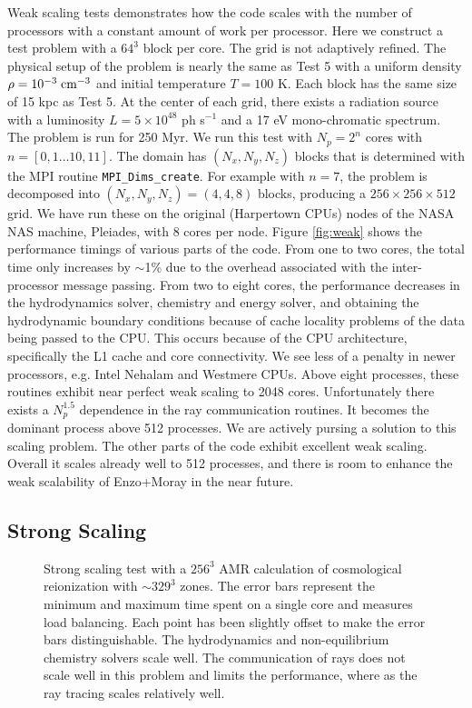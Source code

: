 \documentclass[useAMS,usenatbib,a4paper]{mn2e}
\begin{document}
Weak scaling tests demonstrates how the code scales with the number of
processors with a constant amount of work per processor.  Here we
construct a test problem with a $64^3$ block per core.  The grid is
not adaptively refined.  The physical setup of the problem is nearly
the same as Test 5 with a uniform density $\rho = 10^{-3} \;\cubecm$
and initial temperature $T = 100$ K.  Each block has the same size of
15 kpc as Test 5.  At the center of each grid, there exists a
radiation source with a luminosity $L = 5 \times 10^{48}$ ph s$^{-1}$
and a 17 eV mono-chromatic spectrum.  The problem is run for 250 Myr.
We run this test with $N_p = 2^n$ cores with $n = [0,1 \dots 10,11]$.
The domain has $(N_x, N_y, N_z)$ blocks that is determined with the
MPI routine \texttt{MPI\_Dims\_create}.  For example with $n = 7$, the
problem is decomposed into $(N_x, N_y, N_z) = (4,4,8)$ blocks,
producing a $256 \times 256 \times 512$ grid.  We have run these on
the original (Harpertown CPUs) nodes of the NASA NAS machine,
Pleiades, with 8 cores per node.  Figure \ref{fig:weak} shows the
performance timings of various parts of the code.  From one to two
cores, the total time only increases by $\sim$1\% due to the overhead
associated with the inter-processor message passing.  From two to
eight cores, the performance decreases in the hydrodynamics solver,
chemistry and energy solver, and obtaining the hydrodynamic boundary
conditions because of cache locality problems of the data being passed
to the CPU.  This occurs because of the CPU architecture, specifically
the L1 cache and core connectivity.  We see less of a penalty in newer
processors, e.g. Intel Nehalam and Westmere CPUs.  Above eight
processes, these routines exhibit near perfect weak scaling to 2048
cores.  Unfortunately there exists a $N_p^{1.5}$ dependence in the ray
communication routines.  It becomes the dominant process above 512
processes.  We are actively pursing a solution to this scaling
problem.  The other parts of the code exhibit excellent weak scaling.
Overall it scales already well to 512 processes, and there is room to
enhance the weak scalability of Enzo+Moray in the near future.

\subsection{Strong Scaling}
\label{sec:strong_sc}

\begin{figure}
  \caption{\label{fig:strong} Strong scaling test with a $256^3$ AMR
    calculation of cosmological reionization with $\sim329^3$ zones.
    The error bars represent the minimum and maximum time spent on a
    single core and measures load balancing.  Each point has been
    slightly offset to make the error bars distinguishable.  The
    hydrodynamics and non-equilibrium chemistry solvers scale well.
    The communication of rays does not scale well in this problem and
    limits the performance, where as the ray tracing scales relatively
    well.}
\end{figure}
\end{document}
